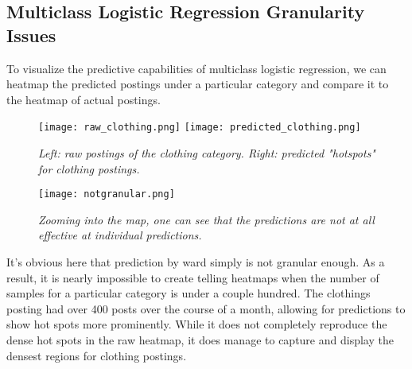 \documentclass[12pt]{article}
\begin{document}
\subsection{Multiclass Logistic Regression Granularity Issues}
To visualize the predictive capabilities of multiclass logistic regression, we can heatmap the predicted postings under a particular category and compare it to the heatmap of actual postings. 

\begin{figure}[h]
\centering
\texttt{[image: raw\_clothing.png]}
\texttt{[image: predicted\_clothing.png]}
\caption{\textit{Left: raw postings of the clothing category. Right: predicted "hotspots" for clothing postings.}}
\end{figure}

\begin{figure}[h]
\centering
\texttt{[image: notgranular.png]}
\caption{\textit{Zooming into the map, one can see that the predictions are not at all effective at individual predictions.}}
\end{figure}

It's obvious here that prediction by ward simply is not granular enough. As a result, it is nearly impossible to create telling heatmaps when the number of samples for a particular category is under a couple hundred. The clothings posting had over 400 posts over the course of a month, allowing for predictions to show hot spots more prominently. While it does not completely reproduce the dense hot spots in the raw heatmap, it does manage to capture and display the densest regions for clothing postings. 
\end{document}
